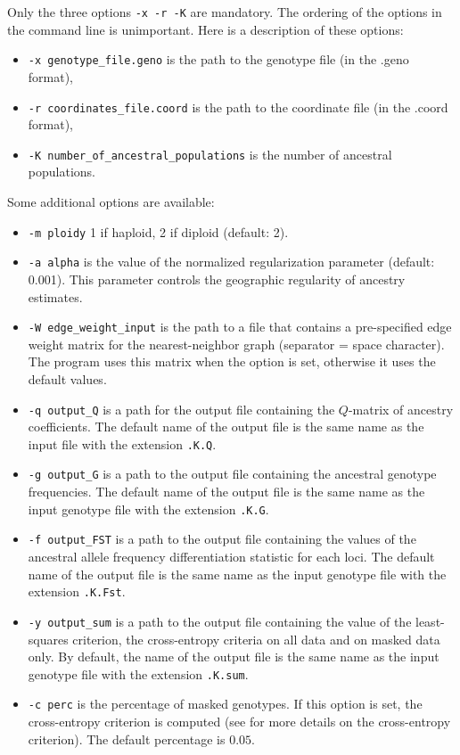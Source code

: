 \documentclass[10pt,a4paper]{article}
\begin{document}
\noindent
Only the three options {\tt -x -r -K}  are mandatory. The ordering of the options in the command line is unimportant. Here is a description of these options:
\begin{itemize}
\item \verb|-x genotype_file.geno| is the path to the genotype file (in the .geno format),
\item \verb|-r coordinates_file.coord| is the path to the coordinate file (in the .coord format),
\item \verb|-K number_of_ancestral_populations| is the number of ancestral populations.
\end{itemize}

\noindent
Some additional options are available:
\begin{itemize}
\item \verb|-m ploidy|  1 if haploid, 2 if diploid (default: 2). 
\item \verb|-a alpha| is the value of the normalized regularization parameter (default: 0.001). This parameter controls the geographic regularity of ancestry estimates.
\item \verb|-W edge_weight_input| is the path to a file that contains a pre-specified edge weight matrix for the nearest-neighbor graph (separator = space character). The program uses this matrix when the option is set, otherwise it uses the default values.
\item \verb|-q output_Q| is a path for the output file containing the $Q$-matrix of ancestry coefficients. The default name of the output file is the same name as the input file with the extension {\tt .K.Q}.
\item \verb|-g output_G| is a path to the output file containing the ancestral genotype frequencies. The default name of the output file is the same name as the input genotype file with the extension {\tt .K.G}.
\item \verb|-f output_FST| is a path to the output file containing the values of the ancestral allele frequency differentiation statistic for each loci. The default name of the output file is the same name as the input genotype file with the extension {\tt .K.Fst}.
\item \verb|-y output_sum| is a path to the output file containing the value of the least-squares criterion, the cross-entropy criteria on all data and on masked data only. By default, the name of the output file is the same name as the input genotype file with the extension {\tt .K.sum}.
\item \verb|-c perc| is the percentage of masked genotypes. If this option is set, the cross-entropy criterion is computed (see\cite{frichot2014fast} for more details on the cross-entropy criterion). The default percentage is $0.05$.

\end{itemize}
\end{document}
